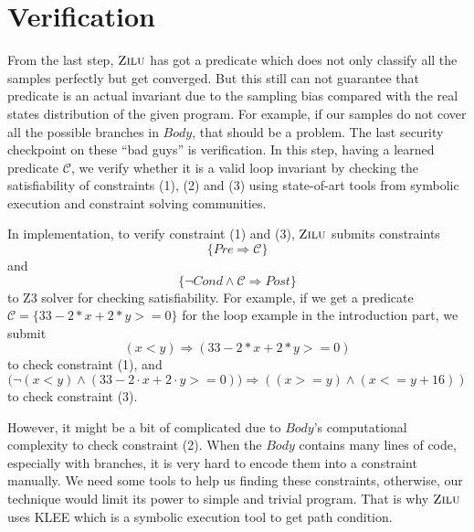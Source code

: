 
\section{Verification} %
\label{sec:verification}
From the last step, $\textsc{Zilu}$ has got a predicate which does not only classify all the samples perfectly but get converged.
But this still can not guarantee that predicate is an actual invariant due to the sampling bias compared with the real states distribution of the given program.
For example, if our samples do not cover all the possible branches in $Body$, that should be a problem.
The last security checkpoint on these ``bad guys'' is verification. 
In this step, having a learned predicate $\mathcal{C}$, we verify whether it is a valid loop invariant by
checking the satisfiability of constraints (1), (2) and (3) using state-of-art tools from symbolic execution and constraint solving communities.

In implementation, to verify constraint (1) and (3), 
$\textsc{Zilu}$ submits constraints $$\{Pre \Rightarrow \mathcal{C}\}$$ and $$\{\neg {Cond} \wedge \mathcal{C} \Rightarrow Post\}$$ to Z3 solver for checking satisfiability.
For example, if we get a predicate $\mathcal{C} = \{33-2*x+2*y>=0\}$
for the loop example in the introduction part, 
we submit 
$$(x<y) \Rightarrow (33-2*x+2*y>=0)$$
to check constraint (1), 
and 
$$\big(\neg(x<y) \wedge (33-2\cdot x+2\cdot y>=0)\big) \Rightarrow ((x >= y) \wedge (x <= y + 16))$$
to check constraint (3).

However, it might be a bit of complicated due to $Body$'s computational complexity to check constraint (2).
When the $Body$ contains many lines of code, especially with branches, it is very hard to encode them into a constraint manually.
We need some tools to help us finding these constraints, otherwise, our technique would limit its power to simple and trivial program. 
That is why $\textsc{Zilu}$ uses KLEE\cite{cadar2008klee} which is a symbolic execution tool to get path condition.





